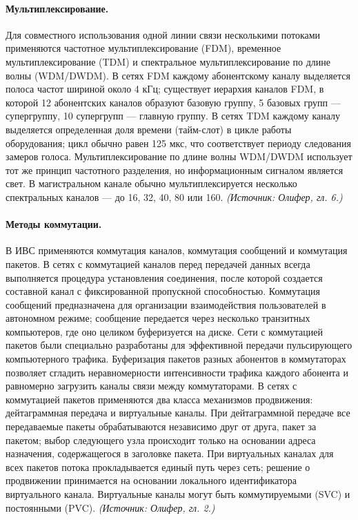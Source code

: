 \documentclass[a4paper,12pt]{article}
\begin{document}
\paragraph{Мультиплексирование.}
Для совместного использования одной линии связи несколькими потоками применяются частотное мультиплексирование (FDM), временное мультиплексирование (TDM) и спектральное мультиплексирование по длине волны (WDM/DWDM). В сетях FDM каждому абонентскому каналу выделяется полоса частот шириной около 4 кГц; существует иерархия каналов FDM, в которой 12 абонентских каналов образуют базовую группу, 5 базовых групп — супергруппу, 10 супергрупп — главную группу. В сетях TDM каждому каналу выделяется определенная доля времени (тайм-слот) в цикле работы оборудования; цикл обычно равен 125 мкс, что соответствует периоду следования замеров голоса. Мультиплексирование по длине волны WDM/DWDM использует тот же принцип частотного разделения, но информационным сигналом является свет. В магистральном канале обычно мультиплексируется несколько спектральных каналов — до 16, 32, 40, 80 или 160.
\textit{(Источник: Олифер, гл. 6.)}

\paragraph{Методы коммутации.}
В ИВС применяются коммутация каналов, коммутация сообщений и коммутация пакетов. В сетях с коммутацией каналов перед передачей данных всегда выполняется процедура установления соединения, после которой создается составной канал с фиксированной пропускной способностью. Коммутация сообщений предназначена для организации взаимодействия пользователей в автономном режиме; сообщение передается через несколько транзитных компьютеров, где оно целиком буферизуется на диске. Сети с коммутацией пакетов были специально разработаны для эффективной передачи пульсирующего компьютерного трафика. Буферизация пакетов разных абонентов в коммутаторах позволяет сгладить неравномерности интенсивности трафика каждого абонента и равномерно загрузить каналы связи между коммутаторами. В сетях с коммутацией пакетов применяются два класса механизмов продвижения: дейтаграммная передача и виртуальные каналы. При дейтаграммной передаче все передаваемые пакеты обрабатываются независимо друг от друга, пакет за пакетом; выбор следующего узла происходит только на основании адреса назначения, содержащегося в заголовке пакета. При виртуальных каналах для всех пакетов потока прокладывается единый путь через сеть; решение о продвижении принимается на основании локального идентификатора виртуального канала. Виртуальные каналы могут быть коммутируемыми (SVC) и постоянными (PVC).
\textit{(Источник: Олифер, гл. 2.)}
\end{document}
